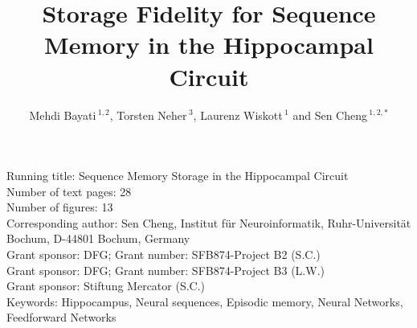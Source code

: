 \documentclass[utf8]{frontiersSCNS} %
\def\firstAuthorLast{} %
\def\Authors{Mehdi Bayati\,$^{1,2}$, Torsten Neher\,$^{3}$, Laurenz Wiskott\,$^{1}$ and Sen Cheng\,$^{1,2,*}$}
\begin{document}
\onecolumn
{}

\title{Storage Fidelity for Sequence Memory in the Hippocampal Circuit} 

\author[\firstAuthorLast ]{\Authors} %
\address{} %
\correspondance{} %

\extraAuth{}%


\maketitle
Running title: Sequence Memory Storage in the Hippocampal Circuit\\
Number of text pages: 28\\
Number of figures: 13\\
Corresponding author: Sen Cheng, Institut f\"ur Neuroinformatik, Ruhr-Universit\"at Bochum, D-44801 Bochum, Germany\\
Grant sponsor: DFG; Grant number: SFB874-Project B2 (S.C.)\\
Grant sponsor: DFG; Grant number: SFB874-Project B3 (L.W.)\\
Grant sponsor: Stiftung Mercator (S.C.)\\
Keywords: Hippocampus, Neural sequences, Episodic memory, Neural Networks, Feedforward Networks\\

\newpage

\linenumbers
\end{document}
